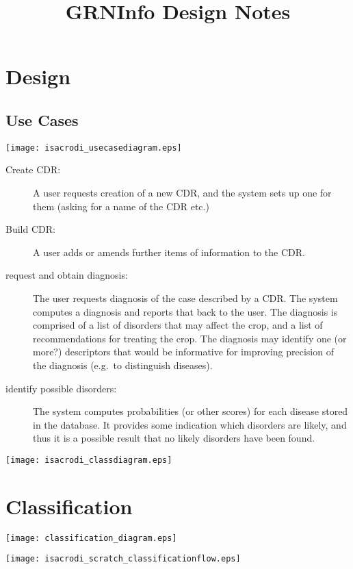 \documentclass[a4paper,fleqn]{article}
\begin{document}
\title{GRNInfo Design Notes}
\author{}
\maketitle

\section{Design}

\subsection{Use Cases}

\texttt{[image: isacrodi\_usecasediagram.eps]}

\begin{description}
\item[Create CDR:] A user requests creation of a new CDR, and the
  system sets up one for them (asking for a name of the CDR etc.)
\item[Build CDR:] A user adds or amends further items of information
  to the CDR.
\item[request and obtain diagnosis:] The user requests diagnosis of
  the case described by a CDR. The system computes a diagnosis and
  reports that back to the user. The diagnosis is comprised of a list
  of disorders that may affect the crop, and a list of recommendations
  for treating the crop. The diagnosis may identify one (or more?)
  descriptors that would be informative for improving precision of the
  diagnosis (e.g.\ to distinguish diseases).
\item[identify possible disorders:] The system computes probabilities
  (or other scores) for each disease stored in the database. It
  provides some indication which disorders are likely, and thus it is
  a possible result that no likely disorders have been found.
\end{description}


\texttt{[image: isacrodi\_classdiagram.eps]}

\pagebreak

\appendix


\section{Classification}


\texttt{[image: classification\_diagram.eps]}

\texttt{[image: isacrodi\_scratch\_classificationflow.eps]}
\end{document}
